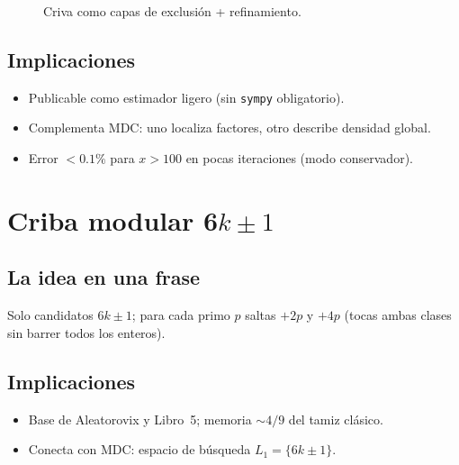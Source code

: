 \documentclass[11pt,a4paper,twoside]{book}
\begin{document}
\begin{figure}[htbp]
\centering
{}
\caption{Criva como capas de exclusión + refinamiento.}
\end{figure}

\section{Implicaciones}
\begin{itemize}[noitemsep]
  \item Publicable como estimador ligero (sin \texttt{sympy} obligatorio).
  \item Complementa MDC: uno localiza factores, otro describe densidad global.
  \item Error $<0.1\%$ para $x>100$ en pocas iteraciones (modo conservador).
\end{itemize}

\chapter{Criba modular 6\texorpdfstring{$k\pm1$}{k±1}}

\section{La idea en una frase}
Solo candidatos $6k\pm1$; para cada primo $p$ saltas $+2p$ y $+4p$
(tocas ambas clases sin barrer todos los enteros).

\section{Implicaciones}
\begin{itemize}[noitemsep]
  \item Base de Aleatorovix y Libro~5; memoria $\sim 4/9$ del tamiz clásico.
  \item Conecta con MDC: espacio de búsqueda $L_1=\{6k\pm1\}$.
\end{itemize}
\end{document}
